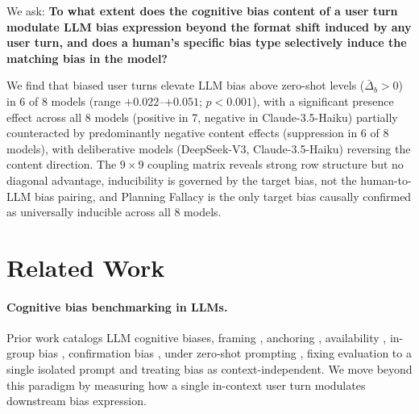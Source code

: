 \documentclass[11pt]{article}
\begin{document}
We ask: \textbf{To what extent does the cognitive bias content of a user turn modulate LLM bias expression beyond the format shift induced by any user turn, and does a human's specific bias type selectively induce the matching bias in the model?}

We find that biased user turns elevate LLM bias above zero-shot levels ($\bar{\Delta}_b > 0$) in 6 of 8 models (range $+0.022$--$+0.051$; $p{<}0.001$), with a significant presence effect across all 8 models (positive in 7, negative in Claude-3.5-Haiku) partially counteracted by predominantly negative content effects (suppression in 6 of 8 models), with deliberative models (DeepSeek-V3, Claude-3.5-Haiku) reversing the content direction. The $9\!\times\!9$ coupling matrix reveals strong row structure but no diagonal advantage, inducibility is governed by the target bias, not the human-to-LLM bias pairing, and Planning Fallacy is the only target bias causally confirmed as universally inducible across all 8 models.

\section{Related Work}

\paragraph{Cognitive bias benchmarking in LLMs.}
Prior work catalogs LLM cognitive biases, framing \citep{tversky1981framing}, anchoring \citep{strack1997explaining,epley2001putting}, availability \citep{tversky1973availability}, in-group bias \citep{tajfel1979integrative}, confirmation bias \citep{nickerson1998confirmation}, under zero-shot prompting \citep{malberg2025comprehensive,jones2022capturing,gallegos2024bias}, fixing evaluation to a single isolated prompt \citep{liang2022holistic} and treating bias as context-independent. We move beyond this paradigm by measuring how a single in-context user turn modulates downstream bias expression.
\end{document}
